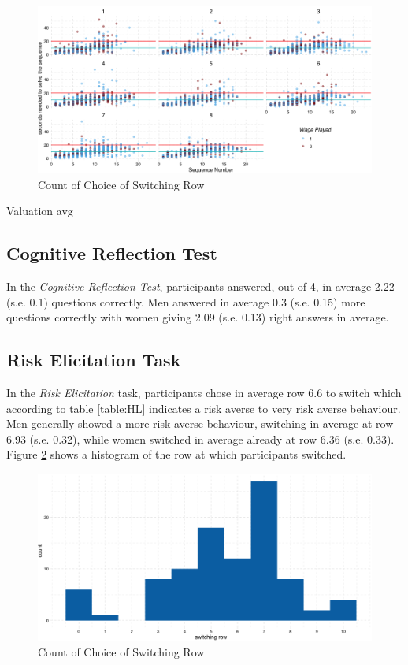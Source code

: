 \begin{figure}
    \centering
    \includegraphics[width=\textwidth]{graphs/time_per_task.png}
    \caption{Count of Choice of Switching Row}
    \label{fig:time_per_task}
\end{figure}

Valuation avg \\

\subsection{Cognitive Reflection Test}
In the \textit{Cognitive Reflection Test}, participants answered, out of 4, in average 2.22 (s.e. 0.1) questions correctly. Men answered in average 0.3 (s.e. 0.15) more questions correctly with women giving 2.09 (s.e. 0.13) right answers in average.\\


\subsection{Risk Elicitation Task}
In the \textit{Risk Elicitation} task, participants chose in average row 6.6 to switch which according to table \ref{table:HL} indicates a risk averse to very risk averse behaviour. Men generally showed a more risk averse behaviour, switching in average at row 6.93 (s.e. 0.32), while women switched in average already at row 6.36 (s.e. 0.33). Figure \ref{fig:hist_mpl} shows a histogram of the row at which participants switched.\\

\begin{figure}
    \centering
    \includegraphics[width=\textwidth]{graphs/hist_mpl.png}
    \caption{Count of Choice of Switching Row}
    \label{fig:hist_mpl}
\end{figure}


